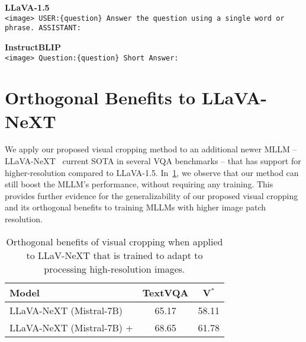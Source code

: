 \begin{tcolorbox}
\textbf{LLaVA-1.5}\\

\texttt{<image>
USER:\{question\} Answer the question using a single word or phrase.
ASSISTANT:}
\end{tcolorbox}


\begin{tcolorbox}
\textbf{InstructBLIP} \\ 

\texttt{<image> Question:\{question\} Short Answer:}
\end{tcolorbox}

\section{Orthogonal Benefits to LLaVA-NeXT}
\label{app:llavanext}
We apply our proposed \rel{} visual cropping method to an additional newer MLLM -- LLaVA-NeXT~\citep{liu2024llavanext} current SOTA in several VQA benchmarks -- that has support for higher-resolution compared to LLaVA-1.5. In~\cref{tab:llavanext}, we observe that our method can still boost the MLLM's performance, without requiring any training. This provides further evidence for the generalizability of our proposed visual cropping and its orthogonal benefits to training MLLMs with higher image patch resolution.

\begin{table}[h]
\caption{Orthogonal benefits of visual cropping when applied to LLaV-NeXT that is trained to adapt to processing high-resolution images.}

\centering
\begin{tabular}{lcc}
\toprule
Model & TextVQA & V$^{*}$ \\
\midrule
LLaVA-NeXT (Mistral-7B) & 65.17 & 58.11\\
LLaVA-NeXT (Mistral-7B) + \rel{} & 68.65 & 61.78\\

\bottomrule
\end{tabular}
\label{tab:llavanext}
\end{table}




